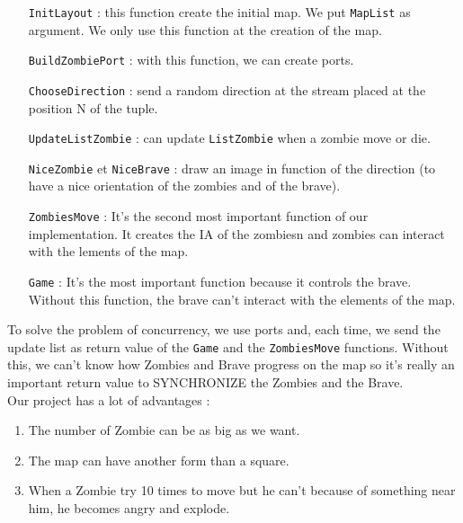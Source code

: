 \begin{itemize}
\item[\texttt{InitLayout} :] this function create the initial map. We put \texttt{MapList} as argument. We only use this function at the creation of the map.
\\

\item[\texttt{BuildZombiePort} :] with this function, we can create ports.
\\

\item[\texttt{ChooseDirection} :] send a random direction at the stream placed at the position N of the tuple.
\\

\item[\texttt{UpdateListZombie} :] can update \texttt{ListZombie} when a zombie move or die.
\\

\item[\texttt{NiceZombie} et \texttt{NiceBrave} :] draw an image in function of the direction (to have a nice orientation of the zombies and of the brave).
\\

\item[\texttt{ZombiesMove} :] It's the second most important function of our implementation. It creates the IA of the zombiesn and zombies can interact with the lements of the map.
\\

\item[\texttt{Game} :] It's the most important function because it controls the brave. Without this function, the brave can't interact with the elements of the map.
\\

\end{itemize}
To solve the problem of concurrency, we use ports and, each time, we send the update list as return value of the \texttt{Game} and the \texttt{ZombiesMove} functions. Without this, we can't know how Zombies and Brave progress on the map so it's really an important return value to SYNCHRONIZE the Zombies and the Brave.\\

Our project has a lot of advantages :
\begin{enumerate}
\item The number of Zombie can be as big as we want.
\item The map can have another form than a square.
\item When a Zombie try 10 times to move but he can't because of something near him, he becomes angry and explode.
\end{enumerate}
